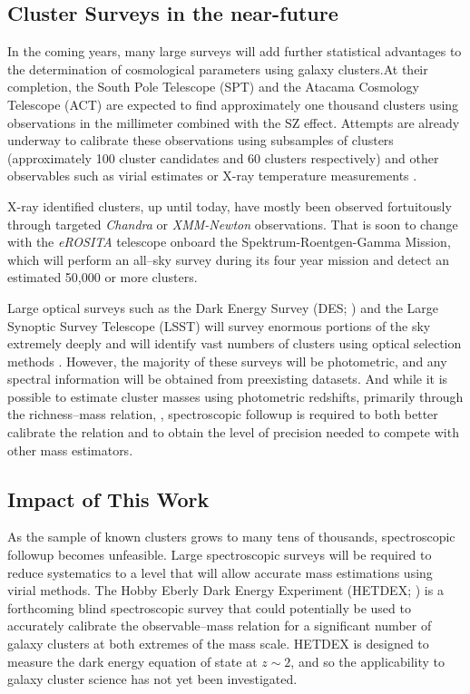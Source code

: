 \documentclass[12pt]{article}
\begin{document}
\subsection{Cluster Surveys in the near-future}
In the coming years, many large surveys will add further statistical advantages to the determination of cosmological parameters using galaxy clusters.At their completion, the South Pole Telescope (SPT) and the Atacama Cosmology Telescope (ACT) are expected to find approximately one thousand clusters using observations in the millimeter combined with the SZ effect. Attempts are already underway to calibrate these observations using subsamples of clusters (approximately 100 cluster candidates and 60 clusters respectively) and other observables such as virial estimates or X-ray temperature measurements . 

X-ray identified clusters, up until today, have mostly been observed fortuitously through targeted \textit{Chandra} or \textit{XMM-Newton} observations. That is soon to change with the \textit{eROSITA} telescope onboard the Spektrum-Roentgen-Gamma Mission, which will perform an all--sky survey during its four year mission and detect an estimated 50,000 or more clusters.

Large optical surveys such as the Dark Energy Survey (DES; \citealt{DES2005}) and the Large Synoptic Survey Telescope (LSST) will survey enormous portions of the sky extremely deeply and will identify vast numbers of clusters using optical selection methods . However, the majority of these surveys will be photometric, and any spectral information will be obtained from preexisting datasets. And while it is possible to estimate cluster masses using photometric redshifts, primarily through the richness--mass relation,  , spectroscopic followup is required to both better calibrate the relation and to obtain the level of precision needed to compete with other mass estimators. 

\subsection{Impact of This Work}
As the sample of known clusters grows to many tens of thousands, spectroscopic followup becomes unfeasible. Large spectroscopic surveys will be required to reduce systematics to a level that will allow accurate mass estimations using virial methods. The Hobby Eberly Dark Energy Experiment (HETDEX; \citealt{Hill2008}) is a forthcoming blind spectroscopic survey that could potentially be used to accurately calibrate the observable--mass relation for a significant number of galaxy clusters at both extremes of the mass scale. HETDEX is designed to measure the dark energy equation of state at $z\sim2$, and so the applicability to galaxy cluster science has not yet been investigated.
\end{document}
